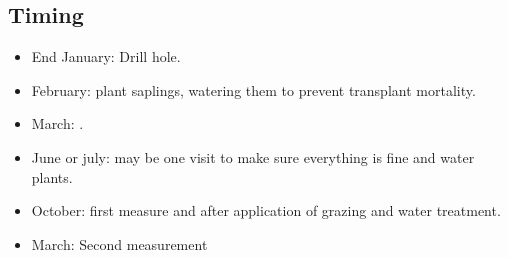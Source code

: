 \documentclass[12pt]{article} %
\begin{document}
\subsection{Timing}
\begin{itemize}

\item End January: Drill hole.
\item February: plant saplings, watering them to prevent transplant mortality.
\item March: .
\item June or july: may be one visit to make sure everything is fine and water plants.
\item October: first measure and after application of grazing and water treatment.
\item March: Second measurement

\end{itemize}




\end{document}
